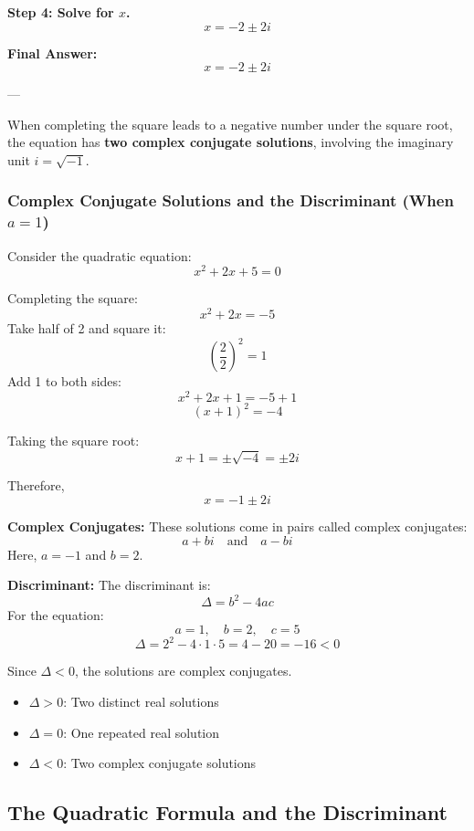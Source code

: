 \documentclass[11pt]{article}
\begin{document}
\textbf{Step 4: Solve for \( x \).}
\[
x = -2 \pm 2i
\]

\textbf{Final Answer:}
\[
\boxed{x = -2 \pm 2i}
\]

---

\begin{tcolorbox}[title=Imaginary Solutions, colback=red!5!white, colframe=red!80!black]
When completing the square leads to a negative number under the square root, the equation has \textbf{two complex conjugate solutions}, involving the imaginary unit \( i = \sqrt{-1} \).
\end{tcolorbox}
\subsubsection*{Complex Conjugate Solutions and the Discriminant (When \(a=1\))}

Consider the quadratic equation:
\[
x^2 + 2x + 5 = 0
\]

Completing the square:
\[
x^2 + 2x = -5
\]
Take half of 2 and square it:
\[
\left(\frac{2}{2}\right)^2 = 1
\]
Add 1 to both sides:
\[
x^2 + 2x + 1 = -5 + 1
\]
\[
(x + 1)^2 = -4
\]

Taking the square root:
\[
x + 1 = \pm \sqrt{-4} = \pm 2i
\]

Therefore,
\[
x = -1 \pm 2i
\]

\bigskip

\textbf{Complex Conjugates:}
These solutions come in pairs called complex conjugates:
\[
a + bi \quad \text{and} \quad a - bi
\]
Here, \(a = -1\) and \(b = 2\).

\bigskip

\textbf{Discriminant:}
The discriminant is:
\[
\Delta = b^2 - 4ac
\]
For the equation:
\[
a = 1, \quad b = 2, \quad c = 5
\]
\[
\Delta = 2^2 - 4 \cdot 1 \cdot 5 = 4 - 20 = -16 < 0
\]

Since \(\Delta < 0\), the solutions are complex conjugates.

\begin{tcolorbox}[title=Summary, colback=cyan!5!white, colframe=cyan!80!black]
\begin{itemize}
  \item \(\Delta > 0\): Two distinct real solutions
  \item \(\Delta = 0\): One repeated real solution
  \item \(\Delta < 0\): Two complex conjugate solutions
\end{itemize}
\end{tcolorbox}
\subsection*{The Quadratic Formula and the Discriminant}
\end{document}

